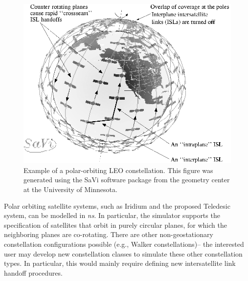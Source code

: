 \begin{figure}
    \centerline{\includegraphics{sat-constellation}}
    \caption{Example of a polar-orbiting LEO constellation.  This figure
was generated using the SaVi software package from the geometry center at the
University of Minnesota.}
    \label{fig:constellation}
\end{figure}

Polar orbiting satellite systems, such as Iridium and the proposed Teledesic 
system, can
be modelled in \emph{ns}.   In particular, the simulator supports the specification
of satellites that orbit in purely circular planes, for which the neighboring 
planes are co-rotating.
There are other non-geostationary constellation configurations  
possible (e.g., Walker constellations)-- the interested user may develop new
constellation classes to simulate these other constellation types.  In
particular, this would mainly require defining new intersatellite link 
handoff procedures.

